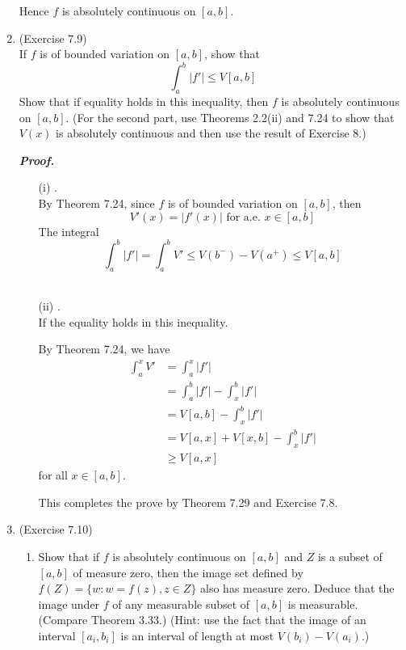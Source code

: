 \documentclass[a4paper,11pt]{article}
\begin{document}
\begin{enumerate}
 		Hence $f$ is absolutely continuous on $[a,b]$.\\









 	\item (Exercise 7.9)\\
 		If $f$ is of bounded variation on $[a,b]$, show that
 		$$\int_a^b |f'| \leq V[a,b]$$
 		Show that if equality holds in this inequality, then $f$ is absolutely continuous on $[a,b]$. (For the second part, use Theorems 2.2(ii) and 7.24 to show that $V(x)$ is absolutely continuous and then use the result of Exercise 8.)\

 		\textit{\textbf {Proof.}}\\
 		\begin{enumerate}
 			\item[(i)].\\
 				By Theorem 7.24, since $f$ is of bounded variation on $[a,b]$, then
 				$$V'(x) = |f'(x)| \mbox{ for a.e. } x \in [a,b]$$
 				The integral
 				$$\int_a^b |f'| = \int_a^b V' \leq V(b^-) - V(a^+) \leq V[a,b]$$\

 			\item[(ii)].\\
 				If the equality holds in this inequality.\

 				By Theorem 7.24, we have
 				$$\begin{aligned}
 				\int_a^x V'
 				&= \int_a^x |f'|\\
 				&= \int_a^b |f'| - \int_x^b |f'|\\
 				&= V[a,b] - \int_x^b |f'|\\
 				&= V[a,x] + V[x,b] - \int_x^b |f'|\\
 				&\geq V[a,x]
 				\end{aligned}$$
 				for all $x \in [a,b]$.\

 				This completes the prove by Theorem 7.29 and Exercise 7.8.\\

 		\end{enumerate}




 	\item (Exercise 7.10)
 		\begin{enumerate}
 			\item Show that if $f$ is absolutely continuous on $[a,b]$ and $Z$ is a subset of $[a,b]$ of measure zero, then the image set defined by $f(Z) = \{w : w = f(z), z \in Z\}$ also has measure zero. Deduce that the image under $f$ of any measurable subset of $[a, b]$ is measurable. (Compare Theorem 3.33.) (Hint: use the fact that the image of an interval $[a_i, b_i]$ is an interval of length at most $V(b_i) - V (a_i)$.)\\


\end{enumerate}
\end{enumerate}
\end{document}
